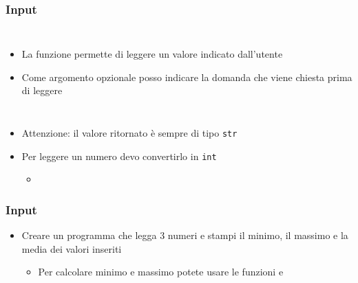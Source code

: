 \begin{contentframe}
    \frametitle{Input}

    \begin{columns}
        \begin{itemize}
            \item La funzione  permette di leggere un valore indicato dall'utente
    
            \bigskip
            \item Come argomento opzionale posso indicare la domanda che viene chiesta prima di leggere
        \end{itemize}
        
        \centering
    \end{columns}

    \bigskip
    \begin{itemize}
        \item Attenzione: il valore ritornato è sempre di tipo \texttt{str}
        \item Per leggere un numero devo convertirlo in \texttt{int}
        \begin{itemize}
            \item {}
        \end{itemize}
    \end{itemize}
\end{contentframe}

\begin{exerciseframe}
    \frametitle{Input}

    \begin{itemize}
        \item Creare un programma che legga 3 numeri e stampi il minimo, il massimo e la media dei valori inseriti
        \begin{itemize}
            \item Per calcolare minimo e massimo potete usare le funzioni  e 
        \end{itemize}
    \end{itemize}
\end{exerciseframe}

